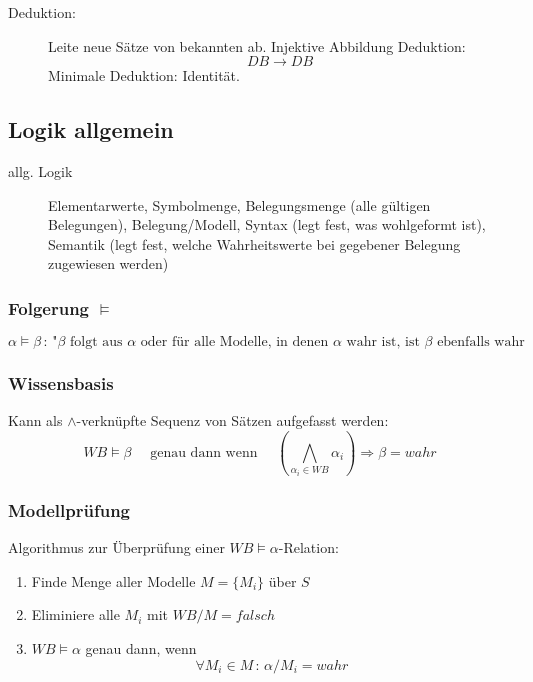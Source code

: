 
\begin{description}
\item[Deduktion:] Leite neue Sätze von bekannten ab. Injektive Abbildung Deduktion: $$DB \to DB$$ Minimale Deduktion: Identität.
\end{description}

\subsection{Logik allgemein}

\begin{description}
	\item[allg. Logik] Elementarwerte, Symbolmenge, Belegungsmenge (alle gültigen Belegungen), Belegung/Modell, Syntax (legt fest, was wohlgeformt ist), Semantik (legt fest, welche Wahrheitswerte bei gegebener Belegung zugewiesen werden)
\end{description}

\subsubsection*{Folgerung $\models$}

$$\alpha \models \beta \, : \, \textrm{"{}} \beta \textrm{ folgt aus } \alpha \textrm{ oder für alle Modelle, in denen } \alpha \textrm{ wahr ist, ist } \beta \textrm{ ebenfalls wahr}$$

\subsubsection*{Wissensbasis}
Kann als $\wedge$-verknüpfte Sequenz von Sätzen aufgefasst werden:
$$WB \models \beta \quad \textrm{ genau dann wenn } \quad \left( \bigwedge\limits_{\alpha_i \in WB} \alpha_i \right) \Rightarrow \beta = wahr$$

\subsubsection*{Modellprüfung}

Algorithmus zur Überprüfung einer $WB \models \alpha$-Relation:
\begin{enumerate}
\item Finde Menge aller Modelle $M = \{M_i\}$ über $S$
\item Eliminiere alle $M_i$ mit $WB/M = falsch$
\item $WB \models \alpha$ genau dann, wenn $$\forall M_i \in M \, : \, \alpha / M_i = wahr$$
\end{enumerate}

